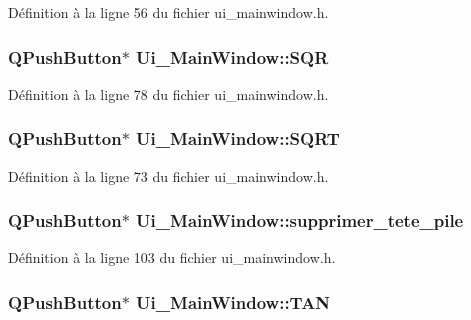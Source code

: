 \-Définition à la ligne 56 du fichier ui\-\_\-mainwindow.\-h.

\hypertarget{class_ui___main_window_a6259c463080f8ffe0be91053e874780b}{
\subsubsection[{\-S\-Q\-R}]{\setlength{\rightskip}{0pt plus 5cm}\-Q\-Push\-Button$\ast$ {\bf \-Ui\-\_\-\-Main\-Window\-::\-S\-Q\-R}}}\label{class_ui___main_window_a6259c463080f8ffe0be91053e874780b}


\-Définition à la ligne 78 du fichier ui\-\_\-mainwindow.\-h.

\hypertarget{class_ui___main_window_a6e35980b83db49bf01e02faf128a8ba4}{
\subsubsection[{\-S\-Q\-R\-T}]{\setlength{\rightskip}{0pt plus 5cm}\-Q\-Push\-Button$\ast$ {\bf \-Ui\-\_\-\-Main\-Window\-::\-S\-Q\-R\-T}}}\label{class_ui___main_window_a6e35980b83db49bf01e02faf128a8ba4}


\-Définition à la ligne 73 du fichier ui\-\_\-mainwindow.\-h.

\hypertarget{class_ui___main_window_a6b4a0425c46ea6e3c9c530196d69b695}{
\subsubsection[{supprimer\-\_\-tete\-\_\-pile}]{\setlength{\rightskip}{0pt plus 5cm}\-Q\-Push\-Button$\ast$ {\bf \-Ui\-\_\-\-Main\-Window\-::supprimer\-\_\-tete\-\_\-pile}}}\label{class_ui___main_window_a6b4a0425c46ea6e3c9c530196d69b695}


\-Définition à la ligne 103 du fichier ui\-\_\-mainwindow.\-h.

\hypertarget{class_ui___main_window_a17184ec702aa5040677142c4a143e5f2}{
\subsubsection[{\-T\-A\-N}]{\setlength{\rightskip}{0pt plus 5cm}\-Q\-Push\-Button$\ast$ {\bf \-Ui\-\_\-\-Main\-Window\-::\-T\-A\-N}}}\label{class_ui___main_window_a17184ec702aa5040677142c4a143e5f2}


